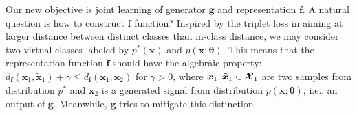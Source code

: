 Our new objective is joint learning of generator $\bm{g}$ and representation $\bm{f}$. A natural question is how to construct $\bm{f}$ function? {Inspired by the triplet loss in \cite{7298682} aiming at larger distance between distinct classes than in-class distance, we may consider two virtual classes labeled by $p^{\ast}(\bm{x})$ and $p(\bm{x};\bm{\theta})$.
This means that the representation function $\bm{f}$ should have the algebraic property: $ d_{\bm{f}}(\bm{x}_1, \tilde{\bm{x}}_1) + \gamma \leq d_{\bm{f}}(\bm{x}_1, \bm{x}_2) $ for $\gamma > 0$, where $\bm{x}_1, \tilde{\bm{x}}_1 \in \bm{\mathcal{X}}_1$ are two samples from distribution $p^{\ast}$ and $\bm{x}_2$ is a generated signal from distribution $p(\bm{x};\bm{\theta})$, i.e., an output of $\bm{g}$. Meanwhile, $\bm{g}$ tries to mitigate this distinction.}

